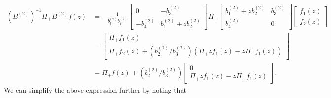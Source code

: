 \documentclass[a4paper,reqno,11pt]{amsart}
\numberwithin{equation}{section}
\numberwithin{figure}{section}
\theoremstyle{plain}
\theoremstyle{remark}
\numberwithin{rhp}{section}
\begin{document}
\begin{align}
    (B^{(2)})^{-1} \Pi_{+} B^{(2)} f(z) &= -\frac{1}{b_3^{(2)} b_4^{(2)}}\begin{bmatrix}
   0 & -b_3^{(2)} \\
   - b_4^{(2)} &  b_1^{(2)} + z b_2^{(2)}
\end{bmatrix} \Pi_{+} \begin{bmatrix}
   b_1^{(2)} + z b_2^{(2)} & b_3^{(2)} \\
    b_4^{(2)} &  0
\end{bmatrix} \begin{bmatrix}
     f_1 (z)  \\
     f_2(z)
\end{bmatrix} \\
&= \begin{bmatrix}
 \Pi_{+}f_1(z)\\
\Pi_{+} f_2(z)+ (b_2^{(2)}/b_3^{(2)}) \left(\Pi_{+} z f_1(z) - z  \Pi_{+}f_1(z)\right)
\end{bmatrix}\\
&= \Pi_{+} f(z) + (b_2^{(2)}/b_3^{(2)}) \begin{bmatrix}
     0 \\
      \Pi_{+} z f_1(z) - z  \Pi_{+}f_1(z)
\end{bmatrix}. 
\end{align}
We can simplify the above expression further by noting that
\end{document}
